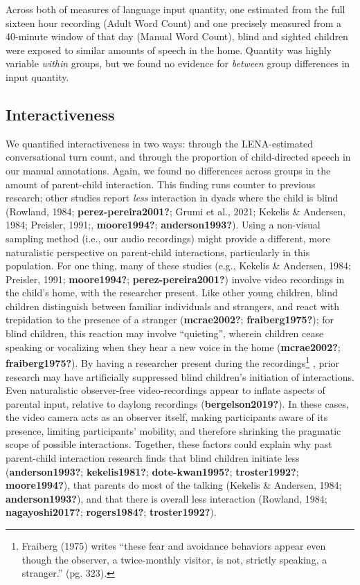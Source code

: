 \documentclass[
  man,floatsintext]{apa6}
\begin{document}
Across both of measures of language input quantity, one estimated from the full sixteen hour recording (Adult Word Count) and one precisely measured from a 40-minute window of that day (Manual Word Count), blind and sighted children were exposed to similar amounts of speech in the home. Quantity was highly variable \emph{within} groups, but we found no evidence for \emph{between} group differences in input quantity.

\hypertarget{interactiveness-1}{%
\subsection{Interactiveness}\label{interactiveness-1}}

We quantified interactiveness in two ways: through the LENA-estimated conversational turn count, and through the proportion of child-directed speech in our manual annotations. Again, we found no differences across groups in the amount of parent-child interaction. This finding runs counter to previous research; other studies report \emph{less} interaction in dyads where the child is blind (Rowland, 1984; \textbf{perez-pereira2001?}; Grumi et al., 2021; Kekelis \& Andersen, 1984; Preisler, 1991;, \textbf{moore1994?}; \textbf{anderson1993?}). Using a non-visual sampling method (i.e., our audio recordings) might provide a different, more naturalistic perspective on parent-child interactions, particularly in this population. For one thing, many of these studies (e.g., Kekelis \& Andersen, 1984; Preisler, 1991; \textbf{moore1994?}; \textbf{perez-pereira2001?}) involve video recordings in the child's home, with the researcher present. Like other young children, blind children distinguish between familiar individuals and strangers, and react with trepidation to the presence of a stranger (\textbf{mcrae2002?}; \textbf{fraiberg1975?}); for blind children, this reaction may involve ``quieting'', wherein children cease speaking or vocalizing when they hear a new voice in the home (\textbf{mcrae2002?}; \textbf{fraiberg1975?}). By having a researcher present during the recordings\footnote{Fraiberg (1975) writes ``these fear and avoidance behaviors appear even though the observer, a twice-monthly visitor, is not, strictly speaking, a stranger.'' (pg. 323).} , prior research may have artificially suppressed blind children's initiation of interactions. Even naturalistic observer-free video-recordings appear to inflate aspects of parental input, relative to daylong recordings (\textbf{bergelson2019?}). In these cases, the video camera acts as an observer itself, making participants aware of its presence, limiting participants' mobility, and therefore shrinking the pragmatic scope of possible interactions. Together, these factors could explain why past parent-child interaction research finds that blind children initiate less (\textbf{anderson1993?}; \textbf{kekelis1981?}; \textbf{dote-kwan1995?}; \textbf{troster1992?}; \textbf{moore1994?}), that parents do most of the talking (Kekelis \& Andersen, 1984; \textbf{anderson1993?}), and that there is overall less interaction (Rowland, 1984; \textbf{nagayoshi2017?}; \textbf{rogers1984?}; \textbf{troster1992?}).
\end{document}
